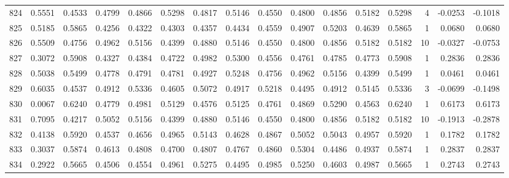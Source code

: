 \begin{tabular}{lrrrrrrrrrrrrrrr}
824 &      0.5551 &  0.4533 &  0.4799 &  0.4866 &  0.5298 &  0.4817 &  0.5146 &  0.4550 &  0.4800 &  0.4856 &   0.5182 &     0.5298 &      4 &                   -0.0253 &                    -0.1018 \\
825 &      0.5185 &  0.5865 &  0.4256 &  0.4322 &  0.4303 &  0.4357 &  0.4434 &  0.4559 &  0.4907 &  0.5203 &   0.4639 &     0.5865 &      1 &                    0.0680 &                     0.0680 \\
826 &      0.5509 &  0.4756 &  0.4962 &  0.5156 &  0.4399 &  0.4880 &  0.5146 &  0.4550 &  0.4800 &  0.4856 &   0.5182 &     0.5182 &     10 &                   -0.0327 &                    -0.0753 \\
827 &      0.3072 &  0.5908 &  0.4327 &  0.4384 &  0.4722 &  0.4982 &  0.5300 &  0.4556 &  0.4761 &  0.4785 &   0.4773 &     0.5908 &      1 &                    0.2836 &                     0.2836 \\
828 &      0.5038 &  0.5499 &  0.4778 &  0.4791 &  0.4781 &  0.4927 &  0.5248 &  0.4756 &  0.4962 &  0.5156 &   0.4399 &     0.5499 &      1 &                    0.0461 &                     0.0461 \\
829 &      0.6035 &  0.4537 &  0.4912 &  0.5336 &  0.4605 &  0.5072 &  0.4917 &  0.5218 &  0.4495 &  0.4912 &   0.5145 &     0.5336 &      3 &                   -0.0699 &                    -0.1498 \\
830 &      0.0067 &  0.6240 &  0.4779 &  0.4981 &  0.5129 &  0.4576 &  0.5125 &  0.4761 &  0.4869 &  0.5290 &   0.4563 &     0.6240 &      1 &                    0.6173 &                     0.6173 \\
831 &      0.7095 &  0.4217 &  0.5052 &  0.5156 &  0.4399 &  0.4880 &  0.5146 &  0.4550 &  0.4800 &  0.4856 &   0.5182 &     0.5182 &     10 &                   -0.1913 &                    -0.2878 \\
832 &      0.4138 &  0.5920 &  0.4537 &  0.4656 &  0.4965 &  0.5143 &  0.4628 &  0.4867 &  0.5052 &  0.5043 &   0.4957 &     0.5920 &      1 &                    0.1782 &                     0.1782 \\
833 &      0.3037 &  0.5874 &  0.4613 &  0.4808 &  0.4700 &  0.4807 &  0.4767 &  0.4860 &  0.5304 &  0.4486 &   0.4937 &     0.5874 &      1 &                    0.2837 &                     0.2837 \\
834 &      0.2922 &  0.5665 &  0.4506 &  0.4554 &  0.4961 &  0.5275 &  0.4495 &  0.4985 &  0.5250 &  0.4603 &   0.4987 &     0.5665 &      1 &                    0.2743 &                     0.2743 \\

\end{tabular}
